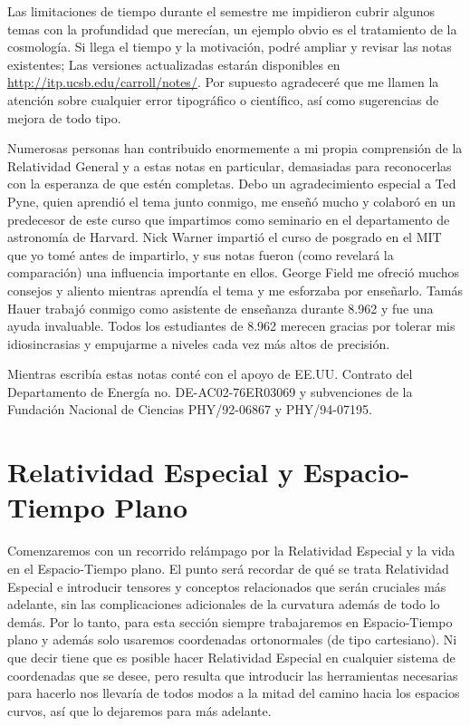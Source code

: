 \documentclass[11pt,b5paper,openany,twoside]{book}
\begin{document}
Las limitaciones de tiempo durante el semestre me impidieron cubrir algunos temas con la profundidad que merecían, un ejemplo obvio es el tratamiento de la cosmología.
Si llega el tiempo y la motivación, podré ampliar y revisar las notas existentes; Las versiones actualizadas estarán disponibles en \href{http://itp.ucsb.edu/carroll/notes/}{http://itp.ucsb.edu/carroll/notes/}.
Por supuesto agradeceré que me llamen la atención sobre cualquier error tipográfico o científico, así como sugerencias de mejora de todo tipo.

Numerosas personas han contribuido enormemente a mi propia comprensión de la Relatividad General y a estas notas en particular, demasiadas para reconocerlas con la esperanza de que estén completas.
Debo un agradecimiento especial a Ted Pyne, quien aprendió el tema junto conmigo, me enseñó mucho y colaboró en un predecesor de este curso que impartimos como seminario en el departamento de astronomía de Harvard.
Nick Warner impartió el curso de posgrado en el MIT que yo tomé antes de impartirlo, y sus notas fueron (como revelará la comparación) una influencia importante en ellos.
George Field me ofreció muchos consejos y aliento mientras aprendía el tema y me esforzaba por enseñarlo.
Tamás Hauer trabajó conmigo como asistente de enseñanza durante 8.962 y fue una ayuda invaluable.
Todos los estudiantes de 8.962 merecen gracias por tolerar mis idiosincrasias y empujarme a niveles cada vez más altos de precisión.

Mientras escribía estas notas conté con el apoyo de EE.UU.
Contrato del Departamento de Energía no. DE-AC02-76ER03069 y subvenciones de la Fundación Nacional de Ciencias PHY/92-06867 y PHY/94-07195.


\chapter{Relatividad Especial y Espacio-Tiempo Plano}

Comenzaremos con un recorrido relámpago por la Relatividad Especial y la vida en el Espacio-Tiempo plano.
El punto será recordar de qué se trata Relatividad Especial e introducir tensores y conceptos relacionados que serán cruciales más adelante, sin las complicaciones adicionales de la curvatura además de todo lo demás.
Por lo tanto, para esta sección siempre trabajaremos en Espacio-Tiempo plano y además solo usaremos coordenadas ortonormales (de tipo cartesiano).
Ni que decir tiene que es posible hacer Relatividad Especial en cualquier sistema de coordenadas que se desee, pero resulta que introducir las herramientas necesarias para hacerlo nos llevaría de todos modos a la mitad del camino hacia los espacios curvos, así que lo dejaremos para más adelante.
\end{document}
